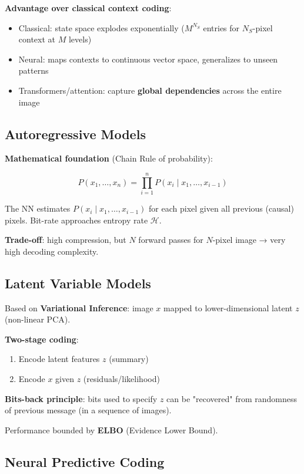\textbf{Advantage over classical context coding}:
\begin{itemize}
\item Classical: state space explodes exponentially ($M^{N_S}$ entries for $N_S$-pixel context at $M$ levels)
\item Neural: maps contexts to continuous vector space, generalizes to unseen patterns
\item Transformers/attention: capture \textbf{global dependencies} across the entire image
\end{itemize}

\subsection{Autoregressive Models}

\textbf{Mathematical foundation} (Chain Rule of probability):

\[
P(x_1, \ldots, x_n) = \prod_{i=1}^n P(x_i \mid x_1, \ldots, x_{i-1})
\]

The NN estimates $P(x_i \mid x_1, \ldots, x_{i-1})$ for each pixel given all previous (causal) pixels. Bit-rate approaches entropy rate $\mathcal{H}$.

\textbf{Trade-off}: high compression, but $N$ forward passes for $N$-pixel image → very high decoding complexity.

\subsection{Latent Variable Models}

Based on \textbf{Variational Inference}: image $x$ mapped to lower-dimensional latent $z$ (non-linear PCA).

\textbf{Two-stage coding}:
\begin{enumerate}
\item Encode latent features $z$ (summary)
\item Encode $x$ given $z$ (residuals/likelihood)
\end{enumerate}

\textbf{Bits-back principle}: bits used to specify $z$ can be "recovered" from randomness of previous message (in a sequence of images).

Performance bounded by \textbf{ELBO} (Evidence Lower Bound).

\subsection{Neural Predictive Coding}

